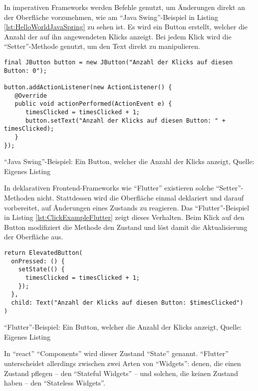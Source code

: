 \clearpage
In imperativen Frameworks werden Befehle genutzt, um Änderungen direkt an der Oberfläche vorzunehmen,
wie am \enquote{Java Swing}-Beispiel in Listing \ref{lst:HelloWorldJavaSpring} zu sehen ist.
Es wird ein Button erstellt, welcher die Anzahl der auf ihn angewendeten Klicks anzeigt.
Bei jedem Klick wird die \enquote{Setter}-Methode  genutzt, um den Text direkt zu manipulieren.

\ifIncludeFigures
  \begin{listing}[h]
    \begin{verbatim}
final JButton button = new JButton("Anzahl der Klicks auf diesen Button: 0");

button.addActionListener(new ActionListener() {
   @Override
   public void actionPerformed(ActionEvent e) {
      timesClicked = timesClicked + 1;
      button.setText("Anzahl der Klicks auf diesen Button: " + timesClicked);
   }
});
\end{verbatim}
    \caption[\enquote{Java Swing}-Beispiel: Ein Button, welcher die Anzahl der Klicks anzeigt]{\enquote{Java Swing}-Beispiel: Ein Button, welcher die Anzahl der Klicks anzeigt, Quelle: Eigenes Listing}
    \label{lst:HelloWorldJavaSpring}
  \end{listing}
\fi

In deklarativen Frontend-Frameworks wie \enquote{Flutter} existieren solche \enquote{Setter}-Methoden nicht.
Stattdessen wird die Oberfläche einmal deklariert und darauf vorbereitet, auf Änderungen eines Zustands zu reagieren.
Das \enquote{Flutter}-Beispiel in Listing \ref{lst:ClickExampleFlutter} zeigt dieses Verhalten.
Beim Klick auf den Button modifiziert die Methode  den Zustand und löst damit die Aktualisierung der Oberfläche aus.

\ifIncludeFigures
  \begin{listing}[h]
    \begin{verbatim}
return ElevatedButton(
  onPressed: () {
    setState(() {
      timesClicked = timesClicked + 1;
    });
  },
  child: Text("Anzahl der Klicks auf diesen Button: $timesClicked")
)
\end{verbatim}
    \caption[\enquote{Flutter}-Beispiel: Ein Button, welcher die Anzahl der Klicks anzeigt]{\enquote{Flutter}-Beispiel: Ein Button, welcher die Anzahl der Klicks anzeigt, Quelle: Eigenes Listing}
    \label{lst:ClickExampleFlutter}
  \end{listing}
\fi

In \enquote{react} \enquote{Components} wird dieser Zustand \enquote{State} genannt.
\enquote{Flutter} unterscheidet allerdings zwischen zwei Arten von \enquote{Widgets}: denen, die einen Zustand pflegen -- den \enquote{Stateful Widgets} -- und solchen, die keinen Zustand haben -- den \enquote{Stateless Widgets}.

